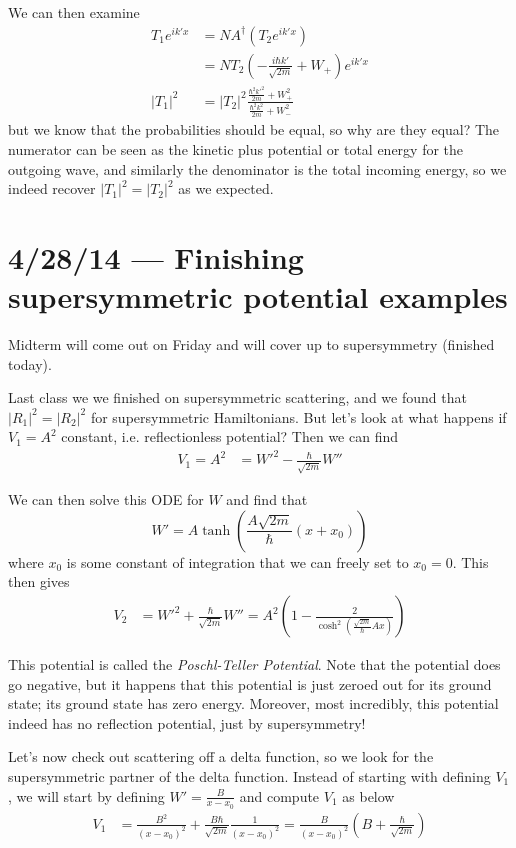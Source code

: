 \documentclass[10pt]{report}
\newcommand{\abs}[1]{\left|#1\right|}
\begin{document}
We can then examine 
\begin{align}
    T_1e^{ik'x} &= NA^\dagger\left(T_2 e^{ik'x}\right)\\
    &= NT_2\left( -\frac{i\hbar k'}{\sqrt{2m}} + W_+ \right)e^{ik'x}\\
    \abs{T_1}^2 &= \abs{T_2}^2 \frac{\frac{\hbar^2 k'^2}{2m} + W_+^2}{\frac{\hbar^2k^2}{2m} + W_-^2}
\end{align}
but we know that the probabilities should be equal, so why are they equal? The numerator can be seen as the kinetic plus potential or total energy for the outgoing wave, and similarly the denominator is the total incoming energy, so we indeed recover $\abs{T_1}^2 = \abs{T_2}^2$ as we expected.

\chapter{4/28/14 --- Finishing supersymmetric potential examples}

Midterm will come out on Friday and will cover up to supersymmetry (finished today). 

Last class we we finished on supersymmetric scattering, and we found that $\abs{R_1}^2 = \abs{R_2}^2$ for supersymmetric Hamiltonians. But let's look at what happens if $V_1 = A^2$ constant, i.e. reflectionless potential? Then we can find
\begin{align}
    V_1 = A^2 &= W'^2 - \frac{\hbar}{\sqrt{2m}}W''
\end{align}

We can then solve this ODE for $W$ and find that
\begin{equation}
    W' = A\tanh \left(\frac{A\sqrt{2m}}{\hbar}(x + x_0)\right)
\end{equation}
where $x_0$ is some constant of integration that we can freely set to $x_0 = 0$. This then gives
\begin{align}
    V_2 &= W'^2 + \frac{\hbar}{\sqrt{2m}}W'' = A^2\left( 1 - \frac{2}{\cosh^2\left( \frac{\sqrt{2m}}{\hbar}Ax \right)} \right)
\end{align}

This potential is called the \emph{Poschl-Teller Potential}. Note that the potential does go negative, but it happens that this potential is just zeroed out for its ground state; its ground state has zero energy. Moreover, most incredibly, this potential indeed has no reflection potential, just by supersymmetry!

Let's now check out scattering off a delta function, so we look for the supersymmetric partner of the delta function. Instead of starting with defining $V_1$, we will start by defining $W' = \frac{B}{x - x_0}$ and compute $V_1$ as below
\begin{align}
    V_1 &= \frac{B^2}{(x-x_0)^2} + \frac{B\hbar}{\sqrt{2m}}\frac{1}{(x-x_0)^2} = \frac{B}{(x-x_0)^2}\left( B + \frac{\hbar}{\sqrt{2m}} \right)
\end{align}
\end{document}
